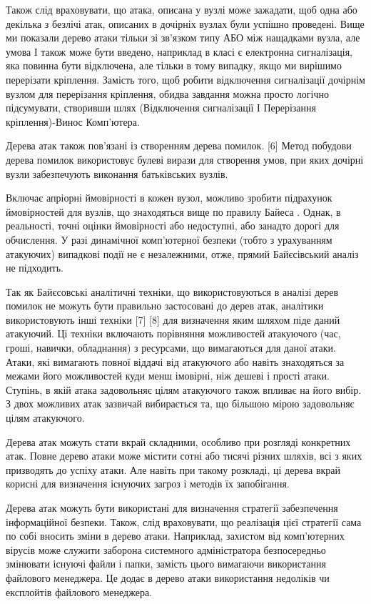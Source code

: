 Також слід враховувати, що атака, описана у вузлі може зажадати, щоб одна або декілька з безлічі атак, описаних в дочірніх вузлах були успішно проведені. Вище ми показали дерево атаки тільки зі зв'язком типу АБО між нащадками вузла, але умова І також може бути введено, наприклад в класі є електронна сигналізація, яка повинна бути відключена, але тільки в тому випадку, якщо ми вирішимо перерізати кріплення. Замість того, щоб робити відключення сигналізації дочірнім вузлом для перерізання кріплення, обидва завдання можна просто логічно підсумувати, створивши шлях (Відключення сигналізації І Перерізання кріплення)-Винос Комп'ютера.

Дерева атак також пов'язані із створенням дерева помилок. {[}6{]} Метод побудови дерева помилок використовує булеві вирази для створення умов, при яких дочірні вузли забезпечують виконання батьківських вузлів.

Включає апріорні ймовірності в кожен вузол, можливо зробити підрахунок ймовірностей для вузлів, що знаходяться вище по правилу Байеса . Однак, в реальності, точні оцінки ймовірності або недоступні, або занадто дорогі для обчислення. У разі динамічної комп'ютерної безпеки (тобто з урахуванням атакуючих) випадкові події не є незалежними, отже, прямий Байєсівський аналіз не підходить.

Так як Байєсовські аналітичні техніки, що використовуються в аналізі дерев помилок не можуть бути правильно застосовані до дерев атак, аналітики використовують інші техніки {[}7{]} {[}8{]} для визначення яким шляхом піде даний атакуючий. Ці техніки включають порівняння можливостей атакуючого (час, гроші, навички, обладнання) з ресурсами, що вимагаються для даної атаки. Атаки, які вимагають повної віддачі від атакуючого або навіть знаходяться за межами його можливостей куди менш імовірні, ніж дешеві і прості атаки. Ступінь, в якій атака задовольняє цілям атакуючого також впливає на його вибір. З двох можливих атак зазвичай вибирається та, що більшою мірою задовольняє цілям атакуючого.

Дерева атак можуть стати вкрай складними, особливо при розгляді конкретних атак. Повне дерево атаки може містити сотні або тисячі різних шляхів, всі з яких призводять до успіху атаки. Але навіть при такому розкладі, ці дерева вкрай корисні для визначення існуючих загроз і методів їх запобігання.

Дерева атак можуть бути використані для визначення стратегії забезпечення інформаційної безпеки. Також, слід враховувати, що реалізація цієї стратегії сама по собі вносить зміни в дерево атаки. Наприклад, захистом від комп'ютерних вірусів може служити заборона системного адміністратора безпосередньо змінювати існуючі файли і папки, замість цього вимагаючи використання файлового менеджера. Це додає в дерево атаки використання недоліків чи експлойтів файлового менеджера.


